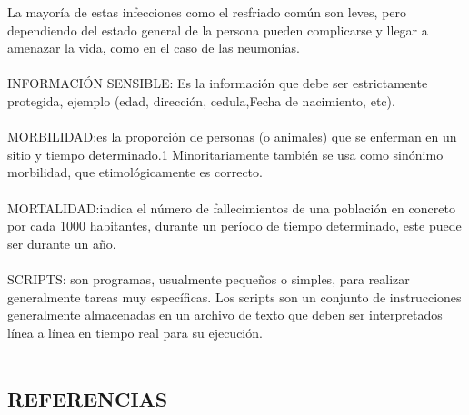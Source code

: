 \documentclass[a4paper,openright,12pt]{book}
\theoremstyle{definition}
\theoremstyle{remark}
\begin{document}
La mayoría de estas infecciones como el resfriado común son leves, pero dependiendo del estado general de la persona pueden complicarse y llegar a amenazar la vida, como en el caso de las neumonías. \\\\
INFORMACIÓN SENSIBLE: Es la información que debe ser estrictamente protegida, ejemplo (edad, dirección, cedula,Fecha de nacimiento, etc).
\\\\
MORBILIDAD:es la proporción de personas (o animales) que se enferman en un sitio y tiempo determinado.1 Minoritariamente también se usa como sinónimo morbilidad, que etimológicamente es correcto.  \\\\
MORTALIDAD:indica el número de fallecimientos de una población en concreto por cada 1000 habitantes, durante un período de tiempo determinado, este puede ser durante un año. \\\\
SCRIPTS: son programas, usualmente pequeños o simples, para realizar generalmente tareas muy específicas. Los scripts son un conjunto de instrucciones generalmente almacenadas en un archivo de texto que deben ser interpretados línea a línea en tiempo real para su ejecución.\\\\
\clearpage

\begin{center}
 \chapter{REFERENCIAS}\label{cap.referencias}
\end{center}
\end{document}
